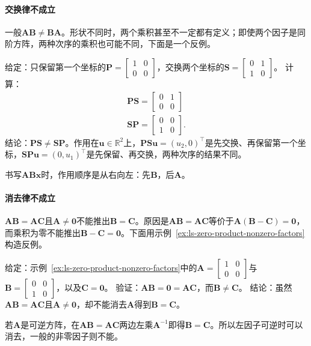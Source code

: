 \paragraph{交换律不成立}
一般$\bm A\bm B\neq\bm B\bm A$。形状不同时，两个乘积甚至不一定都有定义；即使两个因子是同阶方阵，两种次序的乘积也可能不同，下面是一个反例。
\begin{example}[反例：先交换再保留与先保留再交换]
\label{ex:ls-noncommuting-pair}
给定：只保留第一个坐标的$\bm P=\left[\begin{smallmatrix}1&0\\0&0\end{smallmatrix}\right]$，交换两个坐标的$\bm S=\left[\begin{smallmatrix}0&1\\1&0\end{smallmatrix}\right]$。
计算：
\[
\begin{gathered}
\bm P\bm S=\begin{bmatrix}0&1\\0&0\end{bmatrix}\\
\bm S\bm P=\begin{bmatrix}0&0\\1&0\end{bmatrix}.
\end{gathered}
\]
结论：$\bm P\bm S\neq\bm S\bm P$。作用在$\bm u\in\mathbb R^2$上，$\bm P\bm S\bm u=(u_2,0)^\top$是先交换、再保留第一个坐标，$\bm S\bm P\bm u=(0,u_1)^\top$是先保留、再交换，两种次序的结果不同。
\end{example}
书写$\bm A\bm B\bm x$时，作用顺序是从右向左：先$\bm B$，后$\bm A$。

\paragraph{消去律不成立}
$\bm A\bm B=\bm A\bm C$且$\bm A\neq\bm0$不能推出$\bm B=\bm C$。原因是$\bm A\bm B=\bm A\bm C$等价于$\bm A(\bm B-\bm C)=\bm0$，而乘积为零不能推出$\bm B-\bm C=\bm0$。下面用示例~\ref{ex:ls-zero-product-nonzero-factors}构造反例。
\begin{example}[反例：非零的左因子不能消去]
\label{ex:ls-cancellation-fails}
给定：示例~\ref{ex:ls-zero-product-nonzero-factors}中的$\bm A=\left[\begin{smallmatrix}1&0\\0&0\end{smallmatrix}\right]$与$\bm B=\left[\begin{smallmatrix}0&0\\1&0\end{smallmatrix}\right]$，以及$\bm C=\bm0$。
验证：$\bm A\bm B=\bm0=\bm A\bm C$，而$\bm B\neq\bm C$。
结论：虽然$\bm A\bm B=\bm A\bm C$且$\bm A\neq\bm0$，却不能消去$\bm A$得到$\bm B=\bm C$。
\end{example}
若$\bm A$是可逆方阵，在$\bm A\bm B=\bm A\bm C$两边左乘$\bm A^{-1}$即得$\bm B=\bm C$。所以左因子可逆时可以消去，一般的非零因子则不能。

